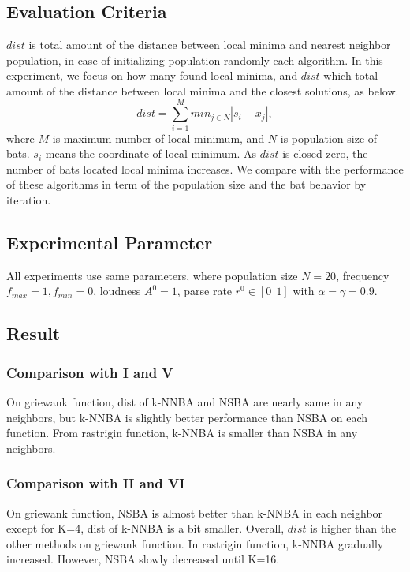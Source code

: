 \documentclass{ies2018}
\begin{document}
\subsection{Evaluation Criteria}
$dist$ is total amount of the distance between local minima and nearest neighbor population, in case of initializing population randomly each algorithm. In this experiment, we focus on how many found local minima, and $dist$ which total amount of the distance between local minima and the closest solutions, as below. \\
\begin{equation}
dist=\sum_{i=1}^M {min_{j \in N}|s_i-x_j|},
\label{eq:dist}
\end{equation}
 where ${M}$ is maximum number of local minimum, and ${N}$ is population size of bats. ${s_i}$ means the coordinate of local minimum. As ${dist}$ is closed zero, the number of bats located local minima increases. We compare with the performance of these algorithms in term of the population size and the bat behavior by iteration. 

\subsection{Experimental Parameter}
All experiments use same parameters, where population size ${N=20}$, frequency ${f_{max}=1, f_{min}=0}$, loudness ${A^0}=1$, parse rate ${r^0} \in [0 \ \ 1]$ with ${\alpha =\gamma = 0.9}$.

\subsection{Result}
 \subsubsection{Comparison with I and V}
On griewank function, dist of k-NNBA and NSBA are nearly same in any neighbors, but k-NNBA is slightly better performance than NSBA on each function. From rastrigin function, k-NNBA is smaller than NSBA in any neighbors.

\subsubsection{Comparison with II and VI}
On griewank function, NSBA is almost better than k-NNBA in each neighbor except for K=4, dist of k-NNBA is a bit smaller. Overall, ${dist}$ is higher than the other methods on griewank function. In rastrigin function, k-NNBA gradually increased. However, NSBA slowly decreased until K=16.
\end{document}
